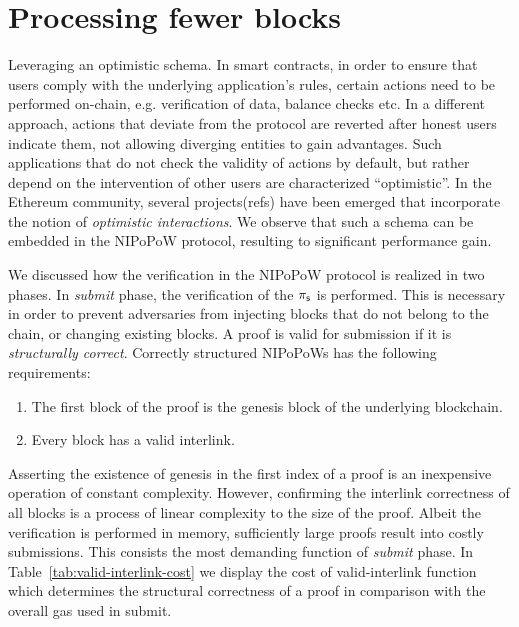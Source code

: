 \section{Processing fewer blocks}

\textsf{Leveraging an optimistic schema.}
In smart contracts, in order to ensure that users comply with the underlying
application's rules, certain actions need to be performed on-chain, e.g.
verification of data, balance checks etc.  In a different approach, actions
that deviate from the protocol are reverted after honest users indicate them,
not allowing diverging entities to gain advantages. Such applications that do
not check the validity of actions by default, but rather depend on the
intervention of other users are characterized ``optimistic''. In the Ethereum
community, several projects(refs) have been emerged that incorporate the notion
of \emph{optimistic interactions}. We observe that such a schema can be
embedded in the NIPoPoW protocol, resulting to significant performance gain.

We discussed how the verification in the NIPoPoW protocol is realized in
two phases. In \emph{submit} phase, the verification of the $\mathsf{\pi_{s}}$ is
performed.  This is necessary in order to prevent adversaries from injecting
blocks that do not belong to the chain, or changing existing blocks. A proof is
valid for submission if it is \emph{structurally correct}. Correctly structured
NIPoPoWs has the following requirements:

\begin{enumerate}
    \item The first block of the proof is the genesis block of the underlying
        blockchain.
    \item Every block has a valid interlink.
\end{enumerate}

Asserting the existence of genesis in the first index of a proof is an
inexpensive operation of constant complexity. However, confirming the interlink
correctness of all blocks is a process of linear complexity to the size of the
proof. Albeit the verification is performed in memory, sufficiently large
proofs result into costly submissions. This consists the most demanding
function of \emph{submit} phase. In Table~\ref{tab:valid-interlink-cost} we
display the cost of \textsf{valid-interlink} function which determines the
structural correctness of a proof in comparison with the overall gas used in
\textsf{submit}.



